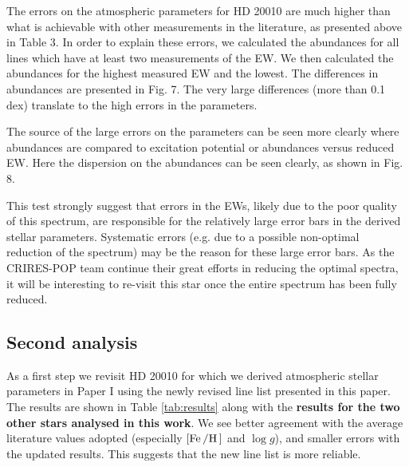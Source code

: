The errors on the atmospheric parameters for HD 20010 are much higher than what is achievable with
other measurements in the literature, as presented above in Table 3. In order to explain these
errors, we calculated the abundances for all lines which have at least two measurements of the EW.
We then calculated the abundances for the highest measured EW and the lowest. The differences in
abundances are presented in Fig. 7. The very large differences (more than 0.1 dex) translate to the
high errors in the parameters.

The source of the large errors on the parameters can be seen more clearly where abundances are
compared to excitation potential or abundances versus reduced EW. Here the dispersion on the
abundances can be seen clearly, as shown in Fig. 8.

This test strongly suggest that errors in the EWs, likely due to the poor quality of this spectrum,
are responsible for the relatively large error bars in the derived stellar parameters. Systematic
errors (e.g. due to a possible non-optimal reduction of the spectrum) may be the reason for these
large error bars. As the CRIRES-POP team continue their great efforts in reducing the optimal
spectra, it will be interesting to re-visit this star once the entire spectrum has been fully
reduced.

\subsection{Second analysis}

As a first step we revisit HD 20010 for which we derived atmospheric stellar
parameters in Paper I using the newly revised line list presented in this paper.
The results are shown in Table \ref{tab:results} along with the {\bf results for
the two other stars analysed in this work}. We see better agreement with the
average literature values adopted (especially $[\ion{Fe}/\ion{H}]$ and $\log g$),
and smaller errors with the updated results. This suggests that the new line
list is more reliable.

